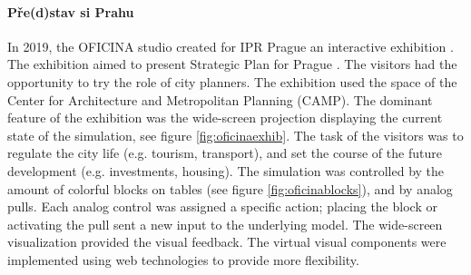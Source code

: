\paragraph{Pře(d)stav si Prahu} 
In 2019, the OFICINA studio created for IPR Prague an interactive exhibition \cite{oficinaPredstav}. The exhibition aimed to present Strategic Plan for Prague \cite{pragueStrategicPlan}. The visitors had the opportunity to try the role of city planners. The exhibition used the space of the Center for Architecture and Metropolitan Planning (CAMP). The dominant feature of the exhibition was the wide-screen projection displaying the current state of the simulation, see figure \ref{fig:oficinaexhib}. The task of the visitors was to regulate the city life (e.g. tourism, transport), and set the course of the future development (e.g. investments, housing). The simulation was controlled by the amount of colorful blocks on tables (see figure \ref{fig:oficinablocks}), and by analog pulls. Each analog control was assigned a specific action; placing the block or activating the pull sent a new input to the underlying model. The wide-screen visualization provided the visual feedback. The virtual visual components were implemented using web technologies to provide more flexibility.

